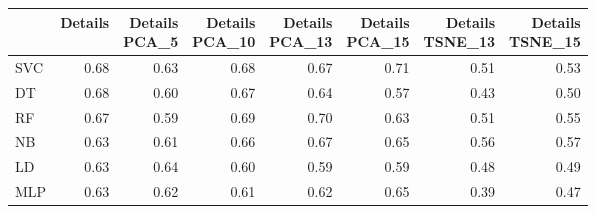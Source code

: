 \documentclass[12pt,italian]{report}
\begin{document}
\begin{table}[h]
	\begin{center}
		\begin{adjustbox}{max width=\textwidth}
			\begin{tabular}{lrrrrrrr}
				\toprule
				{} &   Details &  \thead{Details\\PCA\_5} & \thead{Details\\ PCA\_10} &  \thead{Details\\ PCA\_13} &  \thead{Details\\PCA\_15} &  \thead{Details\\TSNE\_13} &  \thead{Details\\TSNE\_15} \\
				\midrule
				SVC &  0.68 &                  0.63 &                   0.68 &                   0.67 &                   0.71 &                    0.51 &                    0.53 \\
				DT  &  \cellcolor{cyan}0.68 &                  0.60 &                   0.67 &                   0.64 &                   0.57 &                    0.43 &                    0.50 \\
				RF  &  0.67 &                  0.59 &                   0.69 &                   \cellcolor{cyan}0.70 &                   0.63 &                    0.51 &                    0.55 \\
				NB  &  0.63 &                  0.61 &                   0.66 &                   0.67 &                   0.65 &                    0.56 &                    0.57 \\
				LD  &  0.63 &                  0.64 &                   0.60 &                   0.59 &                   0.59 &                    0.48 &                    0.49 \\
				MLP &  0.63 &                  0.62 &                   0.61 &                   0.62 &                   0.65 &                    0.39 &                    0.47 \\
				\bottomrule
			\end{tabular}
		\end{adjustbox}
	\end{center}
\end{table}
\end{document}
